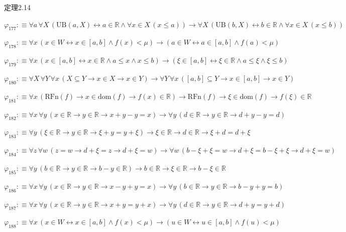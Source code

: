 \begin{fullproof}{定理2.14}
\begin{abbrevlist}
\item $\varphi_{177} :\equiv \forall a\,\forall X\,(\mathrm{UB}(a,X) \leftrightarrow a \in \mathbb{R} \land \forall x \in X\,(x \leq a)) \to \forall X\,(\mathrm{UB}(b,X) \leftrightarrow b \in \mathbb{R} \land \forall x \in X\,(x \leq b))$
\item $\varphi_{178} :\equiv \forall x\,(x \in W \leftrightarrow x \in [a,b] \land f(x) < \mu) \to (a \in W \leftrightarrow a \in [a,b] \land f(a) < \mu)$
\item $\varphi_{179} :\equiv \forall x\,(x \in [a,b] \leftrightarrow x \in \mathbb{R} \land a \leq x \land x \leq b) \to (\xi \in [a,b] \leftrightarrow \xi \in \mathbb{R} \land a \leq \xi \land \xi \leq b)$
\item $\varphi_{180} :\equiv \forall X\,\forall Y\,\forall x\,(X \subseteq Y \to x \in X \to x \in Y) \to \forall Y\,\forall x\,([a,b] \subseteq Y \to x \in [a,b] \to x \in Y)$
\item $\varphi_{181} :\equiv \forall x\,(\mathrm{RFn}(f) \to x \in \mathrm{dom}(f) \to f(x) \in \mathbb{R}) \to \mathrm{RFn}(f) \to \xi \in \mathrm{dom}(f) \to f(\xi) \in \mathbb{R}$
\item $\varphi_{182} :\equiv \forall x\,\forall y\,(x \in \mathbb{R} \to y \in \mathbb{R} \to x + y - y = x) \to \forall y\,(d \in \mathbb{R} \to y \in \mathbb{R} \to d + y - y = d)$
\item $\varphi_{183} :\equiv \forall y\,(\xi \in \mathbb{R} \to y \in \mathbb{R} \to \xi + y = y + \xi) \to \xi \in \mathbb{R} \to d \in \mathbb{R} \to \xi + d = d + \xi$
\item $\varphi_{184} :\equiv \forall z\,\forall w\,(z = w \to d + \xi = z \to d + \xi = w) \to \forall w\,(b - \xi + \xi = w \to d + \xi = b - \xi + \xi \to d + \xi = w)$
\item $\varphi_{185} :\equiv \forall y\,(b \in \mathbb{R} \to y \in \mathbb{R} \to b - y \in \mathbb{R}) \to b \in \mathbb{R} \to \xi \in \mathbb{R} \to b - \xi \in \mathbb{R}$
\item $\varphi_{186} :\equiv \forall x\,\forall y\,(x \in \mathbb{R} \to y \in \mathbb{R} \to x - y + y = x) \to \forall y\,(b \in \mathbb{R} \to y \in \mathbb{R} \to b - y + y = b)$
\item $\varphi_{187} :\equiv \forall x\,\forall y\,(x \in \mathbb{R} \to y \in \mathbb{R} \to x + y = y + x) \to \forall y\,(d \in \mathbb{R} \to y \in \mathbb{R} \to d + y = y + d)$
\item $\varphi_{188} :\equiv \forall x\,(x \in W \leftrightarrow x \in [a,b] \land f(x) < \mu) \to (u \in W \leftrightarrow u \in [a,b] \land f(u) < \mu)$

\end{abbrevlist}
\end{fullproof}
